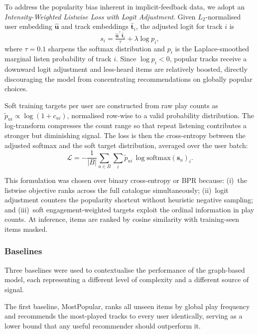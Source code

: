 To address the popularity bias inherent in implicit-feedback data, we adopt an \textit{Intensity-Weighted Listwise Loss with Logit Adjustment}. Given $L_2$-normalised user embedding $\hat{\mathbf{u}}$ and track embeddings $\hat{\mathbf{t}}_i$, the adjusted logit for track $i$ is
\begin{equation}
s_i = \tfrac{\hat{\mathbf{u}}^\top \hat{\mathbf{t}}_i}{\tau} + \lambda \log p_i,
\end{equation}
where $\tau{=}0.1$ sharpens the softmax distribution and $p_i$ is the Laplace-smoothed marginal listen probability of track $i$. Since $\log p_i < 0$, popular tracks receive a downward logit adjustment and less-heard items are relatively boosted, directly discouraging the model from concentrating recommendations on globally popular choices.

Soft training targets per user are constructed from raw play counts as $\tilde{p}_{ui} \propto \log(1+c_{ui})$, normalised row-wise to a valid probability distribution. The log-transform compresses the count range so that repeat listening contributes a stronger but diminishing signal. The loss is then the cross-entropy between the adjusted softmax and the soft target distribution, averaged over the user batch:
\begin{equation}
\mathcal{L} = -\frac{1}{|B|}\sum_{u\in B}\sum_i \tilde{p}_{ui}\,\log\mathrm{softmax}(\mathbf{s}_u)_i.
\end{equation}

This formulation was chosen over binary cross-entropy or BPR because: (i)~the listwise objective ranks across the full catalogue simultaneously; (ii)~logit adjustment counters the popularity shortcut without heuristic negative sampling; and (iii)~soft engagement-weighted targets exploit the ordinal information in play counts. At inference, items are ranked by cosine similarity with training-seen items masked.


\subsubsection{Baselines}
Three baselines were used to contextualise the performance of the graph-based model, each representing a different level of complexity and a different source of signal.

The first baseline, MostPopular, ranks all unseen items by global play frequency and recommends the most-played tracks to every user identically, serving as a lower bound that any useful recommender should outperform it.

